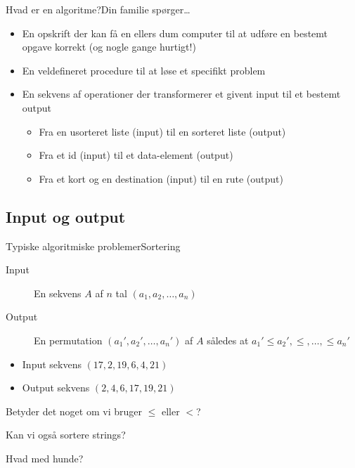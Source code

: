 \documentclass[aspectratio=1610]{beamer}
\begin{document}
\begin{frame}{Hvad er en algoritme?}{Din familie spørger\ldots}
    \pause
    \begin{itemize}
        \item En \alert{opskrift} der kan få en ellers dum computer til at
            udføre en bestemt opgave korrekt (og nogle gange hurtigt!) \pause
        \item En \alert{veldefineret procedure} til at løse et specifikt problem
            \pause
        \item En sekvens af \alert{operationer} der transformerer et givent
            \alert{input} til et bestemt \alert{output}
            \begin{itemize}
                \item Fra en usorteret liste (input) til en sorteret liste
                    (output)
                \item Fra et id (input) til et data-element (output)
                \item Fra et kort og en destination (input) til en rute (output)
            \end{itemize}
    \end{itemize}
\end{frame}

\subsection{Input og output}

\begin{frame}{Typiske algoritmiske problemer}{Sortering}
    \begin{description}
        \item[Input] En sekvens $A$ af $n$ tal $(a_1, a_2, \ldots, a_n)$
            \pause
        \item[Output] En permutation $(a_1', a_2', \ldots, a_n')$ af $A$ således
            at $a_1' \leq a_2', \leq, \ldots, \leq a_n'$ \pause
    \end{description}

    \begin{example}
        \begin{itemize}
            \item Input sekvens $(17, 2, 19, 6, 4, 21)$ \\
            \item Output sekvens $(2, 4, 6, 17, 19, 21)$
        \end{itemize}
    \end{example}

    \pause
    Betyder det noget om vi bruger $\leq$ eller $<$?

    \pause
    Kan vi også sortere strings?

    \pause
    Hvad med hunde?

\end{frame}
\end{document}
